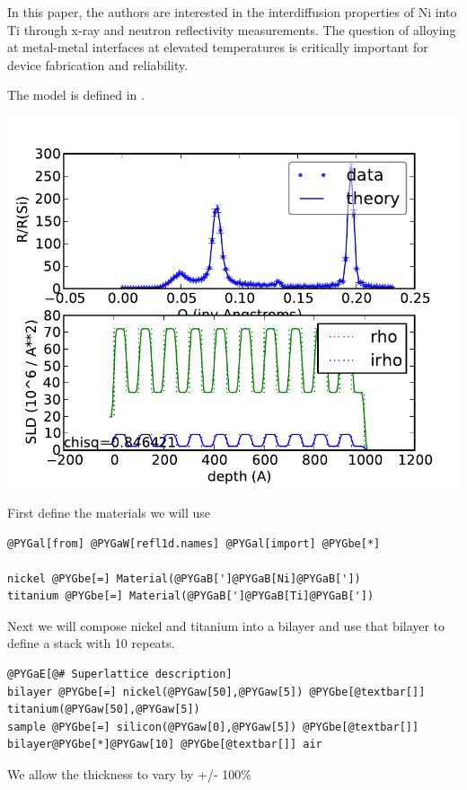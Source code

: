 \documentclass[letterpaper,10pt,english]{sphinxmanual}
\begin{document}
In this paper, the authors are interested in the interdiffusion properties
of Ni into Ti through x-ray and neutron reflectivity measurements. The
question of alloying at metal-metal interfaces at elevated temperatures is
critically important for device fabrication and reliability.

The model is defined in .

\includegraphics{e1eb8621b4.pdf}

First define the materials we will use

\begin{Verbatim}[commandchars=@\[\]]
@PYGal[from] @PYGaW[refl1d.names] @PYGal[import] @PYGbe[*]

nickel @PYGbe[=] Material(@PYGaB[']@PYGaB[Ni]@PYGaB['])
titanium @PYGbe[=] Material(@PYGaB[']@PYGaB[Ti]@PYGaB['])
\end{Verbatim}

Next we will compose nickel and titanium into a bilayer and use that
bilayer to define a stack with 10 repeats.

\begin{Verbatim}[commandchars=@\[\]]
@PYGaE[@# Superlattice description]
bilayer @PYGbe[=] nickel(@PYGaw[50],@PYGaw[5]) @PYGbe[@textbar[]] titanium(@PYGaw[50],@PYGaw[5])
sample @PYGbe[=] silicon(@PYGaw[0],@PYGaw[5]) @PYGbe[@textbar[]] bilayer@PYGbe[*]@PYGaw[10] @PYGbe[@textbar[]] air
\end{Verbatim}

We allow the thickness to vary by +/- 100\%
\end{document}
